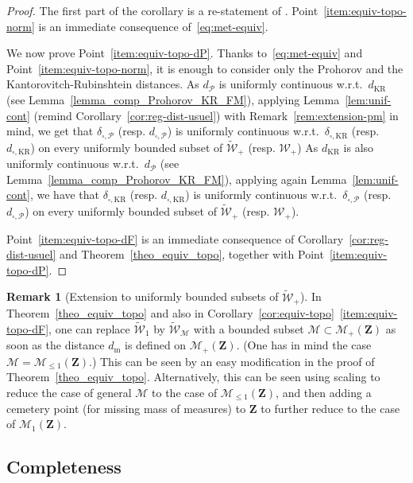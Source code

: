 \documentclass{amsart}
\newcommand{\wrt}{w.r.t.\ }
\theoremstyle{plain}
\theoremstyle{definition}
\newtheorem{rem}[Th]{Remark}
\newcommand{\Space}{\mathbf{Z}}
\newcommand{\cm}{\mathcal{M}}
\newcommand{\cM}{\mathcal{M}}
\newcommand{\Proba}{\mathcal{M}_1(\Space)}
\newcommand{\SubProba}{\mathcal{M}_{\leq1}(\Space)}
\newcommand{\Meas}{\mathcal{M}_+(\Space)}
\newcommand{\Kernelp}{\mathcal{W}_{+}}
\newcommand{\UGraphon}{\widetilde{\mathcal{W}}_1}
\newcommand{\UKernelp}{\widetilde{\mathcal{W}}_{+}}
\newcommand{\UKernelM}{\widetilde{\mathcal{W}}_\cm}
\newcommand{\m}{\mathrm{m}}
\newcommand{\dmeas}{d_\m}
\newcommand{\dmeasP}{d_{\mathcal{P}}}
\newcommand{\dcutP}{d_{\square,\mathcal{P}}}
\newcommand{\ddcutP}{\delta_{\square,\mathcal{P}}}
\newcommand{\mKR}{\text{KR}}
\newcommand{\dmeasKR}{d_{\text{KR}}}
\newcommand{\dcutKR}{d_{\square,\mKR}}
\newcommand{\ddcutKR}{\delta_{\square,\mKR}}
\begin{document}
\begin{proof}
The first part of the corollary is a re-statement of .
  Point~\ref{item:equiv-topo-norm} is an immediate consequence of~\eqref{eq:met-equiv}.
  
  We now prove Point~\ref{item:equiv-topo-dP}.
  Thanks to~\eqref{eq:met-equiv} and Point~\ref{item:equiv-topo-norm}, it is  enough to consider only 
  the Prohorov and the Kantorovitch-Rubinshtein distances.  As $\dmeasP$ is uniformly
  continuous  \wrt  $\dmeasKR$ (see Lemma~\ref{lemma_comp_Prohorov_KR_FM}),  
  applying Lemma~\ref{lem:unif-cont}  (remind Corollary~\ref{cor:reg-dist-usuel})
  	with Remark~\ref{rem:extension-pm} in mind,
  we  get that  $\ddcutP$ (resp. $\dcutP$)  
  	is  uniformly continuous \wrt  $\ddcutKR$ (resp. $\dcutKR$)
	on every uniformly bounded subset of $\UKernelp$ (resp. $\Kernelp$)
  As $\dmeasKR$ is  also uniformly continuous \wrt $\dmeasP$ 
  	(see Lemma~\ref{lemma_comp_Prohorov_KR_FM}),
	applying again Lemma~\ref{lem:unif-cont}, 
   we have that $\ddcutKR$ (resp. $\dcutKR$)  
  	is  uniformly continuous \wrt  $\ddcutP$ (resp. $\dcutP$)
	on every uniformly bounded subset of $\UKernelp$ (resp. $\Kernelp$).
  
  Point~\ref{item:equiv-topo-dF} is an immediate consequence of
  Corollary~\ref{cor:reg-dist-usuel} and Theorem~\ref{theo_equiv_topo},
  together with Point~\ref{item:equiv-topo-dP}.
\end{proof}



\begin{rem}[Extension to uniformly bounded subsets of $\UKernelp$]
  \label{rem:extension-pm-2}
  In Theorem~\ref{theo_equiv_topo} and also in Corollary~\ref{cor:equiv-topo}~\ref{item:equiv-topo-dF},
  one can replace $\UGraphon$ 
  by $\UKernelM$ with a bounded subset $\cm \subset \Meas$
  as soon as the distance $\dmeas$ is defined on $\Meas$.
  (One has in mind the case $\cM=\SubProba$.) This can be seen by an easy modification in the proof of Theorem~\ref{theo_equiv_topo}.
  Alternatively, this can be seen
  using scaling to reduce the case of general $\cm$
  to the case of $\SubProba$, and then adding a cemetery point (for missing mass of measures)
  to $\Space$ to further reduce to the case of $\Proba$.
\end{rem}


\subsection{Completeness}
	\label{subsec:completeness}
\end{document}
